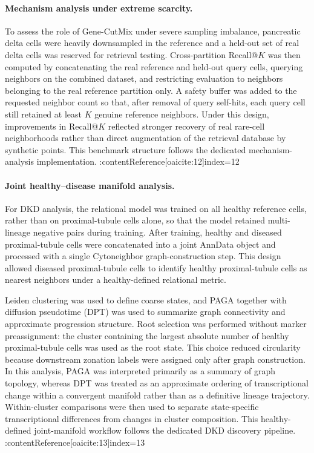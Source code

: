 \documentclass[11pt]{article}
\begin{document}
\paragraph{Mechanism analysis under extreme scarcity.}
To assess the role of Gene-CutMix under severe sampling imbalance, pancreatic delta cells were heavily downsampled in the reference and a held-out set of real delta cells was reserved for retrieval testing. Cross-partition Recall@$K$ was then computed by concatenating the real reference and held-out query cells, querying neighbors on the combined dataset, and restricting evaluation to neighbors belonging to the real reference partition only. A safety buffer was added to the requested neighbor count so that, after removal of query self-hits, each query cell still retained at least $K$ genuine reference neighbors. Under this design, improvements in Recall@$K$ reflected stronger recovery of real rare-cell neighborhoods rather than direct augmentation of the retrieval database by synthetic points. This benchmark structure follows the dedicated mechanism-analysis implementation. :contentReference[oaicite:12]{index=12}

\paragraph{Joint healthy--disease manifold analysis.}
For DKD analysis, the relational model was trained on all healthy reference cells, rather than on proximal-tubule cells alone, so that the model retained multi-lineage negative pairs during training. After training, healthy and diseased proximal-tubule cells were concatenated into a joint AnnData object and processed with a single Cytoneighbor graph-construction step. This design allowed diseased proximal-tubule cells to identify healthy proximal-tubule cells as nearest neighbors under a healthy-defined relational metric.

Leiden clustering was used to define coarse states, and PAGA together with diffusion pseudotime (DPT) was used to summarize graph connectivity and approximate progression structure\cite{Traag2019Leiden,Wolf2019PAGA,Haghverdi2016DPT}. Root selection was performed without marker preassignment: the cluster containing the largest absolute number of healthy proximal-tubule cells was used as the root state. This choice reduced circularity because downstream zonation labels were assigned only after graph construction. In this analysis, PAGA was interpreted primarily as a summary of graph topology, whereas DPT was treated as an approximate ordering of transcriptional change within a convergent manifold rather than as a definitive lineage trajectory. Within-cluster comparisons were then used to separate state-specific transcriptional differences from changes in cluster composition. This healthy-defined joint-manifold workflow follows the dedicated DKD discovery pipeline. :contentReference[oaicite:13]{index=13}
\end{document}
